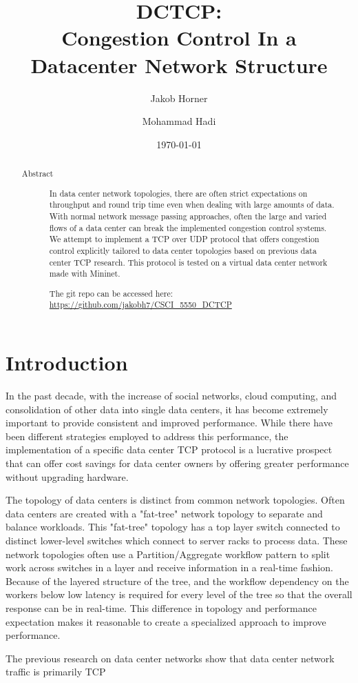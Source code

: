 \documentclass[%
amsmath,amssymb,
aps,
]{revtex4-2}
\begin{document}
\title{DCTCP:\\Congestion Control In a Datacenter Network Structure}

\author{Jakob Horner}

\author{Mohammad Hadi}


\date{\today}

\begin{abstract}
\begin{description}
\item[Abstract]
In data center network topologies, there are often strict expectations on throughput and round trip time even when dealing with large amounts of data. With normal network message passing approaches, often the large and varied flows of a data center can break the implemented congestion control systems. We attempt to implement a TCP over UDP protocol that offers congestion control explicitly tailored to data center topologies based on previous data center TCP research. This protocol is tested on a virtual data center network made with Mininet. 

The git repo can be accessed here: \url{https://github.com/jakobh7/CSCI_5550_DCTCP}
\end{description}
\end{abstract}

\maketitle

\section{Introduction}
In the past decade, with the increase of social networks, cloud computing, and consolidation of  other data into single data centers, it has become extremely important to provide consistent and improved performance. While there have been different strategies employed to address this performance, the implementation of a specific data center TCP protocol is a lucrative prospect that can offer cost savings for data center owners by offering greater performance without upgrading hardware.

The topology of data centers is distinct from common network topologies. Often data centers are created with a "fat-tree" network topology to separate and balance workloads. This "fat-tree" topology has a top layer switch connected to distinct lower-level switches which connect to server racks to process data. These network topologies often use a Partition/Aggregate workflow pattern to split work across switches in a layer and receive information in a real-time fashion. Because of the layered structure of the tree, and the workflow dependency on the workers below low latency is required for every level of the tree so that the overall response can be in real-time. This difference in topology and performance expectation makes it reasonable to create a specialized approach to improve performance.

The previous research on data center networks show that data center network traffic is primarily TCP 
\end{document}
